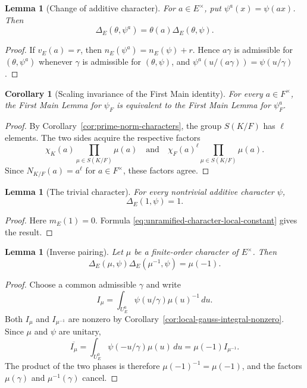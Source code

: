 \documentclass[11pt]{amsart}
\newtheorem{lemma}[theorem]{Lemma}
\newtheorem{corollary}[theorem]{Corollary}
\theoremstyle{definition}
\theoremstyle{remark}
\begin{document}
\begin{lemma}[Change of additive character]\label{lem:additive-scale}
For $a\in E^\times$, put $\psi^a(x)=\psi(ax)$.  Then
\begin{equation}\label{eq:additive-scale}
 \Delta_E(\theta,\psi^a)
 =\theta(a)\Delta_E(\theta,\psi).
\end{equation}
\end{lemma}

\begin{proof}
If $v_E(a)=r$, then $n_E(\psi^a)=n_E(\psi)+r$.  Hence $a\gamma$ is
admissible for $(\theta,\psi^a)$ whenever $\gamma$ is admissible for
$(\theta,\psi)$, and
$\psi^a(u/(a\gamma))=\psi(u/\gamma)$.
\end{proof}

\begin{corollary}[Scaling invariance of the First Main identity]
\label{cor:additive-independence}
For every $a\in F^\times$, the First Main Lemma for $\psi_F$ is
equivalent to the First Main Lemma for $\psi_F^a$.
\end{corollary}

\begin{proof}
By Corollary~\ref{cor:prime-norm-characters}, the group $S(K/F)$ has
$\ell$ elements.  The two sides acquire the respective factors
\[
 \chi_K(a)\prod_{\mu\in S(K/F)}\mu(a)
 \quad\text{and}\quad
 \chi_F(a)^\ell\prod_{\mu\in S(K/F)}\mu(a).
\]
Since $N_{K/F}(a)=a^\ell$ for $a\in F^\times$, these factors agree.
\end{proof}

\begin{lemma}[The trivial character]\label{lem:delta-one}
For every nontrivial additive character $\psi$,
\[
 \Delta_E(1,\psi)=1.
\]
\end{lemma}

\begin{proof}
Here $m_E(1)=0$.  Formula
\eqref{eq:unramified-character-local-constant} gives the result.
\end{proof}

\begin{lemma}[Inverse pairing]\label{lem:inverse-pair}
Let $\mu$ be a finite-order character of $E^\times$.  Then
\begin{equation}\label{eq:inverse-pair}
 \Delta_E(\mu,\psi)\Delta_E(\mu^{-1},\psi)=\mu(-1).
\end{equation}
\end{lemma}

\begin{proof}
Choose a common admissible $\gamma$ and write
\[
 I_\mu=\int_{U_E^0}\psi(u/\gamma)\mu(u)^{-1}\,du.
\]
Both $I_\mu$ and $I_{\mu^{-1}}$ are nonzero by
Corollary~\ref{cor:local-gauss-integral-nonzero}.  Since $\mu$ and
$\psi$ are unitary,
\[
 \overline{I_\mu}
 =\int_{U_E^0}\psi(-u/\gamma)\mu(u)\,du
 =\mu(-1)I_{\mu^{-1}}.
\]
The product of the two phases is therefore $\mu(-1)^{-1}=\mu(-1)$,
and the factors $\mu(\gamma)$ and $\mu^{-1}(\gamma)$ cancel.
\end{proof}
\end{document}
